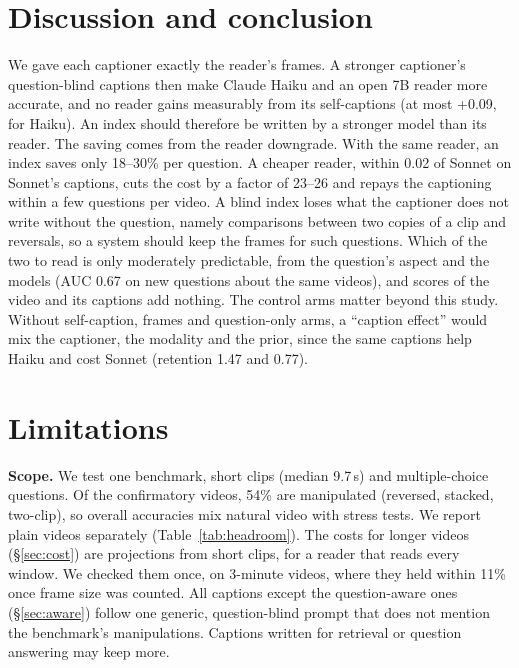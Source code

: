 \documentclass[11pt]{article}
\begin{document}
\section{Discussion and conclusion}
\label{sec:discussion}
We gave each captioner exactly the reader's frames. A stronger captioner's question-blind captions then make Claude Haiku and an open 7B reader more accurate, and no reader gains measurably from its self-captions (at most +0.09, for Haiku). An index should therefore be written by a stronger model than its reader. The saving comes from the reader downgrade. With the same reader, an index saves only 18--30\% per question. A cheaper reader, within 0.02 of Sonnet on Sonnet's captions, cuts the cost by a factor of 23--26 and repays the captioning within a few questions per video. A blind index loses what the captioner does not write without the question, namely comparisons between two copies of a clip and reversals, so a system should keep the frames for such questions. Which of the two to read is only moderately predictable, from the question's aspect and the models (AUC 0.67 on new questions about the same videos), and scores of the video and its captions add nothing. The control arms matter beyond this study. Without self-caption, frames and question-only arms, a ``caption effect'' would mix the captioner, the modality and the prior, since the same captions help Haiku and cost Sonnet (retention 1.47 and 0.77).

\section*{Limitations}
\textbf{Scope.} We test one benchmark, short clips (median 9.7\,s) and multiple-choice questions. Of the confirmatory videos, 54\% are manipulated (reversed, stacked, two-clip), so overall accuracies mix natural video with stress tests. We report plain videos separately (Table~\ref{tab:headroom}). The costs for longer videos (\S\ref{sec:cost}) are projections from short clips, for a reader that reads every window. We checked them once, on 3-minute videos, where they held within 11\% once frame size was counted. All captions except the question-aware ones (\S\ref{sec:aware}) follow one generic, question-blind prompt that does not mention the benchmark's manipulations. Captions written for retrieval or question answering may keep more.
\end{document}
